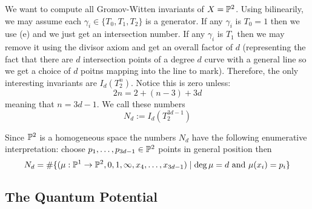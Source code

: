 \documentclass[12pt]{article}
\begin{document}
We want to compute all Gromov-Witten invariants of $X = \P^2$. Using bilinearily, we may assume each $\gamma_i \in \{ T_0, T_1, T_2 \}$ is a generator. If any $\gamma_i$ is $T_0 = 1$ then we use (e) and we just get an intersection number. If any $\gamma_i$ is $T_1$ then we may remove it using the divisor axiom and get an overall factor of $d$ (representing the fact that there are $d$ intersection points of a degree $d$ curve with a general line so we get a choice of $d$ poitns mapping into the line to mark). Therefore, the only interesting invariants are $I_d(T_2^n)$. Notice this is zero unless:
\[ 2 n = 2 + (n-3) + 3d \]
meaning that $n = 3d - 1$. We call these numbers
\[ N_d := I_d(T_2^{3d - 1}) \]

\begin{example}
Since $\P^2$ is a homogeneous space the numbers $N_d$ have the following enumerative interpretation: choose $p_1, \dots, p_{3d - 1} \in \P^2$ points in general position then
\[ N_d = \# \{ (\mu : \P^1 \to \P^2, 0, 1, \infty, x_4, \dots, x_{3d- 1}) \mid \deg{\mu} = d \text{ and } \mu(x_i) = p_i \} \]
\end{example}

\subsection{The Quantum Potential}
\end{document}
